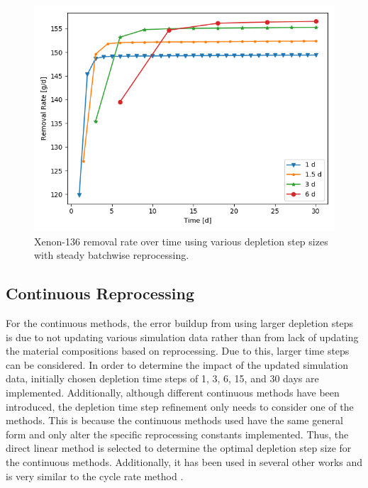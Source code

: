 {\begin{figure}[H]
  \centering
  \includegraphics[scale=0.7]{images/waste_Xe136_6d_sp_comp.png}
  \caption{Xenon-136 removal rate over time using various depletion step sizes with steady batchwise reprocessing.}
   \label{fig:steady-batch-xe136-repr}
\end{figure}

}

\subsection{Continuous Reprocessing}
\label{s:cont-meshing}


For the continuous methods, the error buildup from using larger depletion steps is due to not updating various simulation data rather than from lack of updating the material compositions based on reprocessing. Due to this, larger time steps can be considered. In order to determine the impact of the updated simulation data, initially chosen depletion time steps of 1, 3, 6, 15, and 30 days are implemented. Additionally, although different continuous methods have been introduced, the depletion time step refinement only needs to consider one of the methods. This is because the continuous methods used have the same general form and only alter the specific reprocessing constants implemented. Thus, the direct linear method is selected to determine the optimal depletion step size for the continuous methods. Additionally, it has been used in several other works and is very similar to the cycle rate method \cite{xia_development_2019, nuttin_potential_2005, zhou_fuel_2018}.

